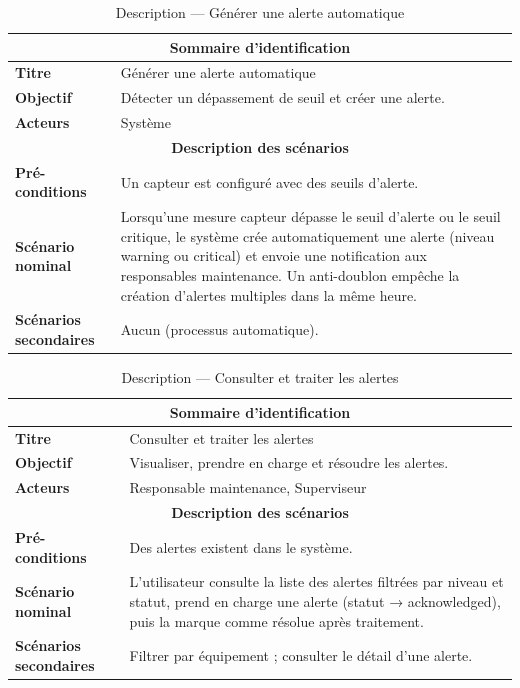 \begin{table}[H]
\centering
\renewcommand{\arraystretch}{1.3}
\begin{tabular}{@{}p{}p{}@{}}
\hline
\multicolumn{2}{c}{\textbf{Sommaire d'identification}} \\
\hline
\textbf{Titre} & Générer une alerte automatique \\
\textbf{Objectif} & Détecter un dépassement de seuil et créer une alerte. \\
\textbf{Acteurs} & Système \\
\hline
\multicolumn{2}{c}{\textbf{Description des scénarios}} \\
\hline
\textbf{Pré-conditions} & Un capteur est configuré avec des seuils d'alerte. \\
\textbf{Scénario nominal} & Lorsqu'une mesure capteur dépasse le seuil d'alerte ou le seuil critique, le système crée automatiquement une alerte (niveau warning ou critical) et envoie une notification aux responsables maintenance. Un anti-doublon empêche la création d'alertes multiples dans la même heure. \\
\textbf{Scénarios secondaires} & Aucun (processus automatique). \\
\hline
\end{tabular}
\caption{Description — Générer une alerte automatique}
\end{table}

\begin{table}[H]
\centering
\renewcommand{\arraystretch}{1.3}
\begin{tabular}{@{}p{}p{}@{}}
\hline
\multicolumn{2}{c}{\textbf{Sommaire d'identification}} \\
\hline
\textbf{Titre} & Consulter et traiter les alertes \\
\textbf{Objectif} & Visualiser, prendre en charge et résoudre les alertes. \\
\textbf{Acteurs} & Responsable maintenance, Superviseur \\
\hline
\multicolumn{2}{c}{\textbf{Description des scénarios}} \\
\hline
\textbf{Pré-conditions} & Des alertes existent dans le système. \\
\textbf{Scénario nominal} & L'utilisateur consulte la liste des alertes filtrées par niveau et statut, prend en charge une alerte (statut → acknowledged), puis la marque comme résolue après traitement. \\
\textbf{Scénarios secondaires} & Filtrer par équipement ; consulter le détail d'une alerte. \\
\hline
\end{tabular}
\caption{Description — Consulter et traiter les alertes}
\end{table}


